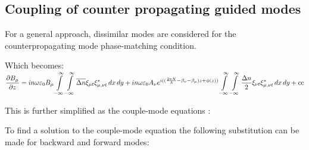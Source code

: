 \documentclass[11pt, openright]{book}
\begin{document}
         \subsection*{Coupling of counter propagating guided modes}

         For a general approach, dissimilar modes are considered for the counterpropagating mode phase-matching condition. 

         Which becomes: $\displaystyle{\frac{\partial B_\mu}{\partial z} =in\omega\varepsilon_0B_\mu \int\limits_{-\infty}^{\infty} \int\limits_{-\infty}^{\infty} \overline{\Delta n}\xi_{\mu t}\xi_{\mu,\nu t}^* \,dx  \,dy +in\omega\varepsilon_0A_\nu e^{i((\frac{2\pi N}{\Lambda}-\beta_\nu-\beta_\mu)z+\phi(z))} \int\limits_{-\infty}^{\infty} \int\limits_{-\infty}^{\infty} \frac{\Delta n}{2}\xi_{\nu t}\xi_{\mu,\nu t}^* \,dx  \,dy +cc }$

         This is further simplified as the couple-mode equations : 

         To find a solution to the couple-mode equation the following substitution can be made for backward and forward modes: 
\end{document}
